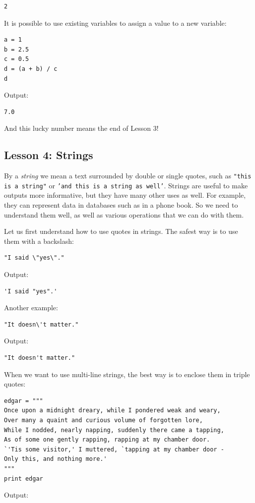 \documentclass[article,A4,12pt]{llncs}
\begin{document}
\begin{verbatim}
2
\end{verbatim}
It is possible to use existing variables to assign a value to a new variable:

\begin{verbatim}
a = 1
b = 2.5
c = 0.5
d = (a + b) / c
d
\end{verbatim}
Output:

\begin{verbatim}
7.0
\end{verbatim}
And this lucky number means the end of Lesson 3!

\subsection{Lesson 4: Strings}

By a {\em string} we mean a text surrounded by double or single quotes, such as 
{\tt "this is a string"} or {\tt 'and this is a string as well'}.
Strings are useful to make outputs more informative, but 
they have many other uses as well. For example, they can represent data 
in databases such as in a phone book. So we need to understand them well,
as well as various operations that we can do with them.

Let us first understand how to use quotes in strings. The safest way is to use 
them with a backslash:

\begin{verbatim}
"I said \"yes\"."
\end{verbatim}
Output:

\begin{verbatim}
'I said "yes".'
\end{verbatim}
Another example:

\begin{verbatim}
"It doesn\'t matter."
\end{verbatim}
Output:

\begin{verbatim}
"It doesn't matter."
\end{verbatim}
When we want to use multi-line strings, the best way is to enclose them 
in triple quotes:

\begin{verbatim}
edgar = """
Once upon a midnight dreary, while I pondered weak and weary,
Over many a quaint and curious volume of forgotten lore,
While I nodded, nearly napping, suddenly there came a tapping,
As of some one gently rapping, rapping at my chamber door.
`'Tis some visitor,' I muttered, `tapping at my chamber door -
Only this, and nothing more.'
"""
print edgar
\end{verbatim}
Output:
\end{document}
